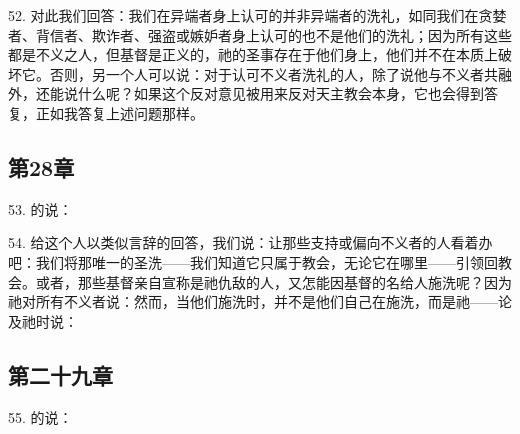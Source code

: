 52. 对此我们回答：我们在异端者身上认可的并非异端者的洗礼，如同我们在贪婪者、背信者、欺诈者、强盗或嫉妒者身上认可的也不是他们的洗礼；因为所有这些都是不义之人，但基督是正义的，祂的圣事存在于他们身上，他们并不在本质上破坏它。否则，另一个人可以说：对于认可不义者洗礼的人，除了说他与不义者共融外，还能说什么呢？如果这个反对意见被用来反对天主教会本身，它也会得到答复，正如我答复上述问题那样。\par


\subsection{第28章}

53. 的说：\par

54. 给这个人以类似言辞的回答，我们说：让那些支持或偏向不义者的人看着办吧：我们将那唯一的圣洗——我们知道它只属于教会，无论它在哪里——引领回教会。或者，那些基督亲自宣称是祂仇敌的人，又怎能因基督的名给人施洗呢？因为祂对所有不义者说：然而，当他们施洗时，并不是他们自己在施洗，而是祂——论及祂时说：\par


\subsection{第二十九章}

55. 的说：\par

